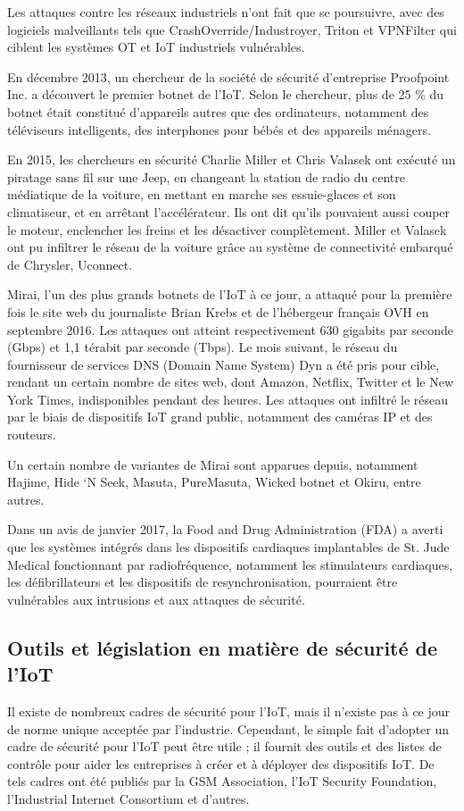 Les attaques contre les réseaux industriels n’ont fait que se poursuivre, avec des logiciels malveillants tels que CrashOverride/Industroyer, Triton et VPNFilter qui ciblent les systèmes OT et IoT industriels vulnérables.

En décembre 2013, un chercheur de la société de sécurité d’entreprise Proofpoint Inc. a découvert le premier botnet de l’IoT. Selon le chercheur, plus de 25 \% du botnet était constitué d’appareils autres que des ordinateurs, notamment des téléviseurs intelligents, des interphones pour bébés et des appareils ménagers.

En 2015, les chercheurs en sécurité Charlie Miller et Chris Valasek ont exécuté un piratage sans fil sur une Jeep, en changeant la station de radio du centre médiatique de la voiture, en mettant en marche ses essuie-glaces et son climatiseur, et en arrêtant l’accélérateur. Ils ont dit qu’ils pouvaient aussi couper le moteur, enclencher les freins et les désactiver complètement. Miller et Valasek ont pu infiltrer le réseau de la voiture grâce au système de connectivité embarqué de Chrysler, Uconnect.

Mirai, l’un des plus grands botnets de l’IoT à ce jour, a attaqué pour la première fois le site web du journaliste Brian Krebs et de l’hébergeur français OVH en septembre 2016. Les attaques ont atteint respectivement 630 gigabits par seconde (Gbps) et 1,1 térabit par seconde (Tbps). Le mois suivant, le réseau du fournisseur de services DNS (Domain Name System) Dyn a été pris pour cible, rendant un certain nombre de sites web, dont Amazon, Netflix, Twitter et le New York Times, indisponibles pendant des heures. Les attaques ont infiltré le réseau par le biais de dispositifs IoT grand public, notamment des caméras IP et des routeurs.

Un certain nombre de variantes de Mirai sont apparues depuis, notamment Hajime, Hide ‘N Seek, Masuta, PureMasuta, Wicked botnet et Okiru, entre autres.

Dans un avis de janvier 2017, la Food and Drug Administration (FDA) a averti que les systèmes intégrés dans les dispositifs cardiaques implantables de St. Jude Medical fonctionnant par radiofréquence, notamment les stimulateurs cardiaques, les défibrillateurs et les dispositifs de resynchronisation, pourraient être vulnérables aux intrusions et aux attaques de sécurité.

\subsection*{Outils et législation en matière de sécurité de l’IoT}
Il existe de nombreux cadres de sécurité pour l’IoT, mais il n’existe pas à ce jour de norme unique acceptée par l’industrie. Cependant, le simple fait d’adopter un cadre de sécurité pour l’IoT peut être utile ; il fournit des outils et des listes de contrôle pour aider les entreprises à créer et à déployer des dispositifs IoT. De tels cadres ont été publiés par la GSM Association, l’IoT Security Foundation, l’Industrial Internet Consortium et d’autres.

